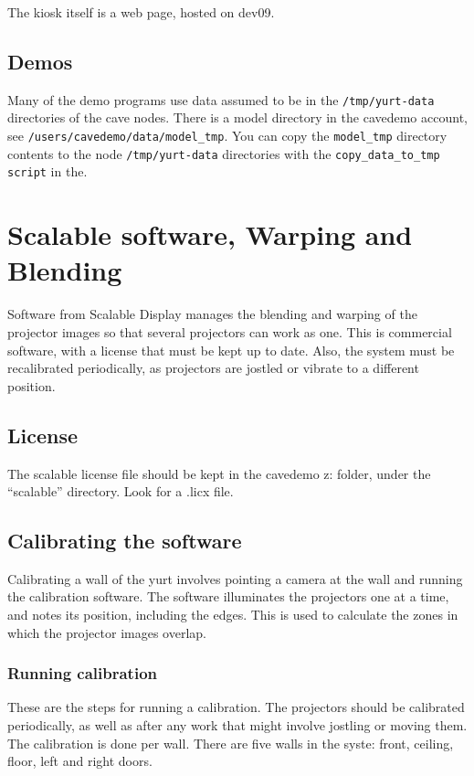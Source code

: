 \documentclass[11pt]{article}
\begin{document}
The kiosk itself is a web page, hosted on dev09.

\subsection{Demos}
\label{Demos}

Many of the demo programs use data assumed to be in the
\texttt{/tmp/yurt-data} directories of the cave nodes.  There is a
model directory in the cavedemo account, see
\texttt{/users/cavedemo/data/model\_tmp}.  You can copy the
\texttt{model\_tmp} directory contents to the node
\texttt{/tmp/yurt-data} directories with the
\texttt{copy\_data\_to\_tmp script} in the.


\section{Scalable software, Warping and Blending}

Software from Scalable Display manages the blending and warping of the
projector images so that several projectors can work as one.  This is
commercial software, with a license that must be kept up to date.
Also, the system must be recalibrated periodically, as projectors are
jostled or vibrate to a different position.

\subsection{License}

The scalable license file should be kept in the cavedemo z: folder,
under the ``scalable'' directory.  Look for a .licx file.

\subsection{Calibrating the software}

Calibrating a wall of the yurt involves pointing a camera at the wall
and running the calibration software.  The software illuminates the
projectors one at a time, and notes its position, including the edges.
This is used to calculate the zones in which the projector images
overlap.

\subsubsection{Running calibration}

These are the steps for running a calibration.  The projectors should
be calibrated periodically, as well as after any work that might
involve jostling or moving them.  The calibration is done per wall.
There are five walls in the syste: front, ceiling, floor, left and
right doors.
\end{document}
